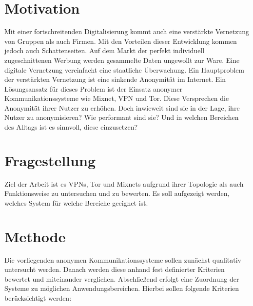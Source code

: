 \section{Motivation}

Mit einer fortschreitenden Digitalisierung kommt auch eine verstärkte Vernetzung von Gruppen als auch Firmen. Mit den Vorteilen dieser Entwicklung kommen jedoch auch Schattenseiten. Auf dem Markt der perfekt individuell zugeschnittenen Werbung werden gesammelte Daten ungewollt zur Ware. Eine digitale Vernetzung vereinfacht eine staatliche Überwachung.
Ein Hauptproblem der verstärkten Vernetzung ist eine sinkende Anonymität im Internet.
Ein Lösungsansatz für dieses Problem ist der Einsatz anonymer Kommunikationssysteme wie Mixnet, VPN und Tor. Diese Versprechen die Anonymität ihrer Nutzer zu erhöhen. Doch inwieweit sind sie in der Lage, ihre Nutzer zu anonymisieren? Wie performant sind sie? Und in welchen Bereichen des Alltags ist es sinnvoll, diese einzusetzen?

\section{Fragestellung}

Ziel der Arbeit ist es VPNs, Tor und Mixnets aufgrund ihrer Topologie als auch Funktionsweise zu untersuchen und zu bewerten. Es soll aufgezeigt werden, welches System für welche Bereiche geeignet ist.

\section{Methode}

Die vorliegenden anonymen Kommunikationssysteme sollen zunächst qualitativ untersucht werden. Danach werden diese anhand fest definierter Kriterien bewertet und miteinander verglichen. Abschließend erfolgt eine Zuordnung der Systeme zu möglichen Anwendungsbereichen. Hierbei sollen folgende Kriterien berücksichtigt werden:

